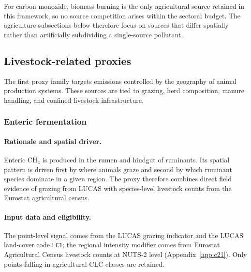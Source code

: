 For carbon monoxide, biomass burning is the only agricultural source
retained in this framework, so no source competition arises within the
sectoral budget. The agriculture subsections below therefore focus on
sources that differ spatially rather than artificially subdividing a
single-source pollutant.

\subsection{Livestock-related proxies}

The first proxy family targets emissions controlled by the geography of
animal production systems. These sources are tied to grazing, herd
composition, manure handling, and confined livestock infrastructure.

\subsubsection{Enteric fermentation}
\label{sec:mu-rho-enteric}

\paragraph{Rationale and spatial driver.}
Enteric CH$_4$ is produced in the rumen and hindgut of ruminants. Its
spatial pattern is driven first by where animals graze and second by
which ruminant species dominate in a given region. The proxy therefore
combines direct field evidence of grazing from LUCAS with species-level
livestock counts from the Eurostat agricultural census.

\paragraph{Input data and eligibility.}
The point-level signal comes from the LUCAS grazing indicator and the
LUCAS land-cover code \texttt{LC1}; the regional intensity modifier
comes from Eurostat Agricultural Census livestock counts at NUTS-2
level (Appendix~\ref{app:c21}). Only points falling in agricultural CLC
classes are retained.

